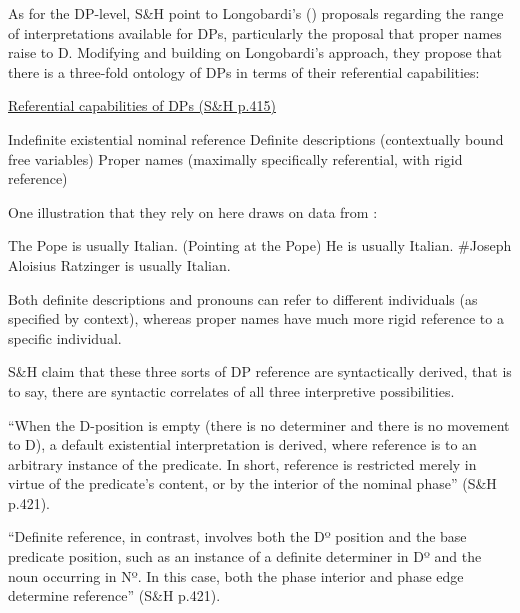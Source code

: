 \documentclass[output=paper
,modfonts
,nonflat
]{langsci/langscibook}
\begin{document}
As for the DP-level, S\&H point to Longobardi’s (\citeyear{Longobardi:1994,Longobardi:2005}) proposals regarding the range of interpretations available for DPs, particularly the proposal that proper names raise to D. Modifying and building on Longobardi’s approach, they propose that there is a three-fold ontology of DPs in terms of their referential capabilities: 

\ea \underline{Referential capabilities of DPs (S\&H p.415)}

\begin{xlist}
\ex Indefinite existential nominal reference 
\ex Definite descriptions (contextually bound free variables)
\ex Proper names (maximally specifically referential, with rigid reference)

\end{xlist}

\z

One illustration that they rely on here draws on data from \citet{Elbourne:2008}: 

\ea	

\begin{xlist}
\ex The Pope is usually Italian.
\ex (Pointing at the Pope) He is usually Italian.
\ex \#Joseph Aloisius Ratzinger is usually Italian.
\end{xlist}

\z

Both definite descriptions and pronouns can refer to different individuals (as specified by context), whereas proper names have much more rigid reference to a specific individual. 

S\&H claim that these three sorts of DP reference are syntactically derived, that is to say, there are syntactic correlates of all three interpretive possibilities. 

\begin{displayquote}

\begin{small}
``When the D-position is empty (there is no determiner and there is no movement to D), a default existential interpretation is derived, where reference is to an arbitrary instance of the predicate. In short, reference is restricted merely in virtue of the predicate’s content, or by the interior of the nominal phase'' (S\&H p.421).  

``Definite reference, in contrast, involves both the Dº position and the base predicate position, such as an instance of a definite determiner in Dº and the noun occurring in Nº. In this case, both the phase interior and phase edge determine reference” (S\&H p.421). 

\end{small}

\end{displayquote}
\end{document}
